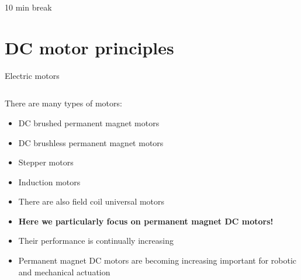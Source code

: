 \documentclass[compress]{beamer}
\makeatletter
\let\beamer@writeslidentry@miniframeson=\beamer@writeslidentry
\def\beamer@writeslidentry@miniframesoff{%
  \expandafter\beamer@ifempty\expandafter{\beamer@framestartpage}{}%
  {%
    \clearpage\beamer@notesactions%
  }
}
\newcommand*{\miniframeson}{\let\beamer@writeslidentry=\beamer@writeslidentry@miniframeson}
\newcommand*{\miniframesoff}{\let\beamer@writeslidentry=\beamer@writeslidentry@miniframesoff}
\makeatother
\begin{document}
\miniframesoff
\begin{frame}[plain]
    \begin{center}
        \Large
        10 min break\\[2em]
    \end{center}
\end{frame}
\miniframeson



\section[DC motors]{DC motor principles}

\begin{frame}{Electric motors}
    \begin{columns}
        \begin{column}{0.7\linewidth}

    There are many types of motors:

    \begin{itemize}
        \item DC brushed permanent magnet motors
        \item DC brushless permanent magnet motors
        \item Stepper motors
        \item Induction motors
        \item There are also field coil universal motors
        \item \textbf{Here we particularly focus on permanent magnet DC motors!}
        \item Their performance is continually increasing
        \item Permanent magnet DC motors are becoming increasing important for
            robotic and mechanical actuation
    \end{itemize}


\end{column}
\end{columns}
\end{frame}
\end{document}
